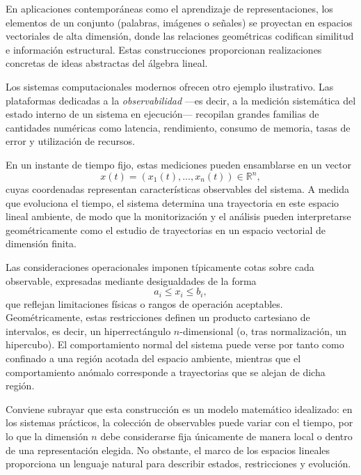 En aplicaciones contemporáneas como el aprendizaje de representaciones,
los elementos de un conjunto (palabras, imágenes o señales) se proyectan en
espacios vectoriales de alta dimensión, donde las relaciones geométricas
codifican similitud e información estructural.
Estas construcciones proporcionan realizaciones concretas de ideas abstractas
del álgebra lineal.

\medskip

Los sistemas computacionales modernos ofrecen otro ejemplo ilustrativo.
Las plataformas dedicadas a la \emph{observabilidad} ---es decir, a la medición
sistemática del estado interno de un sistema en ejecución--- recopilan grandes
familias de cantidades numéricas como latencia, rendimiento, consumo de
memoria, tasas de error y utilización de recursos.

\medskip

En un instante de tiempo fijo, estas mediciones pueden ensamblarse en un vector
\[
x(t) = (x_1(t),\dots,x_n(t)) \in \mathbb{R}^n,
\]
cuyas coordenadas representan características observables del sistema.
A medida que evoluciona el tiempo, el sistema determina una trayectoria en este
espacio lineal ambiente, de modo que la monitorización y el análisis pueden
interpretarse geométricamente como el estudio de trayectorias en un espacio
vectorial de dimensión finita.

\medskip

Las consideraciones operacionales imponen típicamente cotas sobre cada observable,
expresadas mediante desigualdades de la forma
\[
a_i \le x_i \le b_i,
\]
que reflejan limitaciones físicas o rangos de operación aceptables.
Geométricamente, estas restricciones definen un producto cartesiano de
intervalos, es decir, un hiperrectángulo $n$-dimensional (o, tras
normalización, un hipercubo).
El comportamiento normal del sistema puede verse por tanto como confinado a
una región acotada del espacio ambiente, mientras que el comportamiento
anómalo corresponde a trayectorias que se alejan de dicha región.

\medskip

Conviene subrayar que esta construcción es un modelo matemático idealizado:
en los sistemas prácticos, la colección de observables puede variar con el
tiempo, por lo que la dimensión $n$ debe considerarse fija únicamente de manera
local o dentro de una representación elegida.
No obstante, el marco de los espacios lineales proporciona un lenguaje natural
para describir estados, restricciones y evolución.

